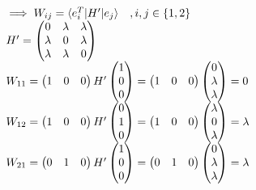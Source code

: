 \documentclass[14pt]{extarticle}
\makeatletter
\newenvironment{lefteqs}{%
    \begin{flushleft}%
    \renewcommand{\arraystretch}{1.3}%
    $\begin{array}{@{}l@{}}%
}{%
    \end{array}$%
    \end{flushleft}%
}
\makeatother
\begin{document}
\begin{lefteqs}
    \implies W_{ij} = \langle e_i^T | H' | e_j \rangle \quad , i,j \in \{1,2\} \\
    H' = \begin{pmatrix}
        0 & \lambda & \lambda \\
        \lambda & 0 & \lambda \\
        \lambda & \lambda & 0
    \end{pmatrix} \\
    W_{11} = \begin{pmatrix}1 & 0 & 0\end {pmatrix} H' \begin{pmatrix}1 \\ 0 \\ 0\end{pmatrix}
    = \begin{pmatrix}1 & 0 & 0 \end{pmatrix} \begin{pmatrix} 0 \\ \lambda \\ \lambda \end{pmatrix} = 0 \\
    W_{12} = \begin{pmatrix}1 & 0 & 0\end {pmatrix} H' \begin{pmatrix}0 \\ 1 \\ 0\end{pmatrix}
    = \begin{pmatrix}1 & 0 & 0 \end{pmatrix} \begin{pmatrix} \lambda \\ 0 \\ \lambda \end{pmatrix} = \lambda \\
    W_{21} = \begin{pmatrix}0 & 1 & 0\end {pmatrix} H' \begin{pmatrix}1 \\ 0 \\ 0\end{pmatrix}
    = \begin{pmatrix}0 & 1 & 0 \end{pmatrix} \begin{pmatrix} 0 \\ \lambda \\ \lambda \end{pmatrix} = \lambda \\

\end{lefteqs}
\end{document}
